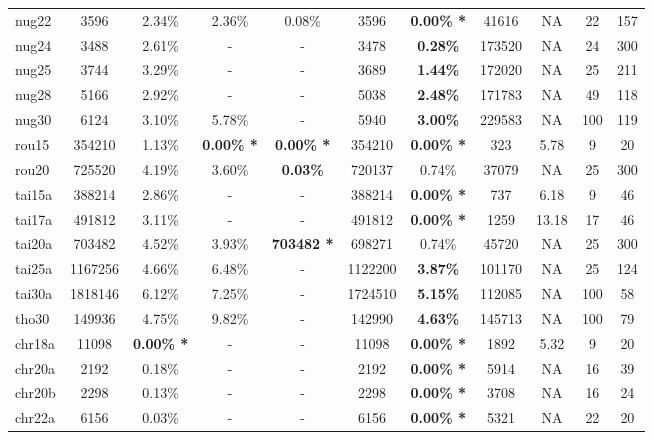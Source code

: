 \documentclass[authoryear,12pt,a4paper,times]{elsarticle}
\begin{document}
\begin{table}[!htb]
\begin{tabular}{l|c|c|c|c|c|c|c|c|c|c}
nug22    & 3596    & 2.34\%       & 2.36\%        & 0.08\%          &  3596       & {\bf 0.00\% *} & 41616     &   NA    & 22    & 157 \\ 
nug24    & 3488    & 2.61\%       & -             &  -              &  3478       & {\bf 0.28\% }  & 173520    &   NA    & 24    & 300 \\
nug25    & 3744    & 3.29\%       & -             &  -              &  3689       & {\bf 1.44\% }  & 172020    &   NA    & 25    & 211 \\ 
nug28    & 5166    & 2.92\%       & -             &  -              &  5038       & {\bf 2.48\% }  & 171783    &   NA    & 49    & 118\\ 
nug30    & 6124    & 3.10\%       & 5.78\%        &  -              &  5940       & {\bf 3.00\% }  & 229583    &   NA    & 100   & 119 \\ \hline
rou15    & 354210  & 1.13\%       & {\bf 0.00\% *}& {\bf 0.00\% *}  &  354210     & {\bf 0.00\% *} & 323       &  5.78   & 9     & 20  \\ 
rou20    & 725520  & 4.19\%       & 3.60\%        & {\bf 0.03\%  }  &  720137     & 0.74\%         & 37079     &   NA    & 25    & 300 \\ \hline
tai15a   & 388214  & 2.86\%       & -             &  -              &  388214     & {\bf 0.00\% *} & 737       &  6.18   &  9    &  46 \\ 
tai17a   & 491812  & 3.11\%       & -             &  -              &  491812     & {\bf 0.00\% *} & 1259      &  13.18  & 17    &  46 \\ 
tai20a   & 703482  & 4.52\%       & 3.93\%        & {\bf 703482 * } &  698271     & 0.74\%         & 45720     &   NA    & 25    & 300 \\ 
tai25a   & 1167256 & 4.66\%       & 6.48\%        &  -              &  1122200    & {\bf 3.87\% }  & 101170    &   NA    &  25   & 124   \\ 
tai30a   & 1818146 & 6.12\%       & 7.25\%        &  -              &  1724510    & {\bf 5.15\% }  & 112085    &   NA    & 100   & 58 \\ \hline
tho30    & 149936  & 4.75\%       & 9.82\%        &  -              &  142990     & {\bf 4.63\% }  & 145713    &   NA    & 100   & 79 \\ \hline
chr18a   & 11098   & {\bf 0.00\% *}& -            &  -              &  11098      & {\bf 0.00\% *} & 1892      &  5.32   &   9   & 20  \\ 
chr20a   & 2192    & 0.18\%       & -             &  -              &  2192       & {\bf 0.00\% *} & 5914      &   NA    &  16   & 39   \\ 
chr20b   & 2298    & 0.13\%       & -             &  -              &  2298       & {\bf 0.00\% *} & 3708      &   NA    &  16   & 24   \\ 
chr22a   & 6156    & 0.03\%       & -             &  -              &  6156       & {\bf 0.00\% *} & 5321      &   NA    &  22   & 20  \\ 

\end{tabular}
\label{Tabela1}
\end{table}
\end{document}
